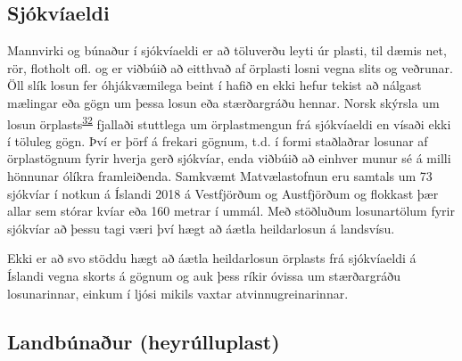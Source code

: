 \documentclass[icelandic,]{book}
\begin{document}
\hypertarget{sjokviaeldi}{%
\subsection*{Sjókvíaeldi}\label{sjokviaeldi}}

Mannvirki og búnaður í sjókvíaeldi er að töluverðu leyti úr plasti, til dæmis net, rör, flotholt ofl. og er viðbúið að eitthvað af örplasti losni vegna slits og veðrunar. Öll slík losun fer óhjákvæmilega beint í hafið en ekki hefur tekist að nálgast mælingar eða gögn um þessa losun eða stærðargráðu hennar. Norsk skýrsla um losun örplasts\textsuperscript{\protect\hyperlink{ref-sundt2014sources}{32}} fjallaði stuttlega um örplastmengun frá sjókvíaeldi en vísaði ekki í töluleg gögn. Því er þörf á frekari gögnum, t.d. í formi staðlaðrar losunar af örplastögnum fyrir hverja gerð sjókvíar, enda viðbúið að einhver munur sé á milli hönnunar ólíkra framleiðenda.
Samkvæmt Matvælastofnun eru samtals um 73 sjókvíar í notkun á Íslandi 2018 á Vestfjörðum og Austfjörðum og flokkast þær allar sem stórar kvíar eða 160 metrar í ummál. Með stöðluðum losunartölum fyrir sjókvíar að þessu tagi væri því hægt að áætla heildarlosun á landsvísu.

Ekki er að svo stöddu hægt að áætla heildarlosun örplasts frá sjókvíaeldi á Íslandi vegna skorts á gögnum og auk þess ríkir óvissa um stærðargráðu losunarinnar, einkum í ljósi mikils vaxtar atvinnugreinarinnar.

\hypertarget{landbunaur-heyrulluplast}{%
\subsection*{Landbúnaður (heyrúlluplast)}\label{landbunaur-heyrulluplast}}
\end{document}

